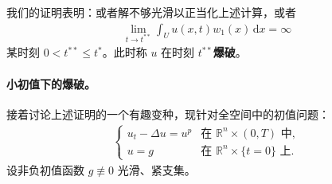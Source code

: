 \documentclass[../../main.tex]{subfiles}
\begin{document}
我们的证明表明：或者解不够光滑以正当化上述计算，或者
\begin{align*}
\lim_{t\to t^{**}}\int_U u(x,t)w_1(x)\,\mathrm{d}x=\infty
\end{align*}
某时刻 $0<t^{**}\leqslant t^*$。此时称 $u$ 在时刻 $t^{**}$\textbf{爆破}。

\paragraph{小初值下的爆破。}接着讨论上述证明的一个有趣变种，现针对全空间中的初值问题：
\begin{align}
\begin{cases}
u_t-\Delta u=u^p&\text{在 }\mathbb{R}^n\times(0,T)\text{ 中},\\
u=g&\text{在 }\mathbb{R}^n\times\{t=0\}\text{ 上}.
\end{cases}\label{align:ch09-4-eq06}
\end{align}
设非负初值函数 $g\not\equiv 0$ 光滑、紧支集。
\end{document}

